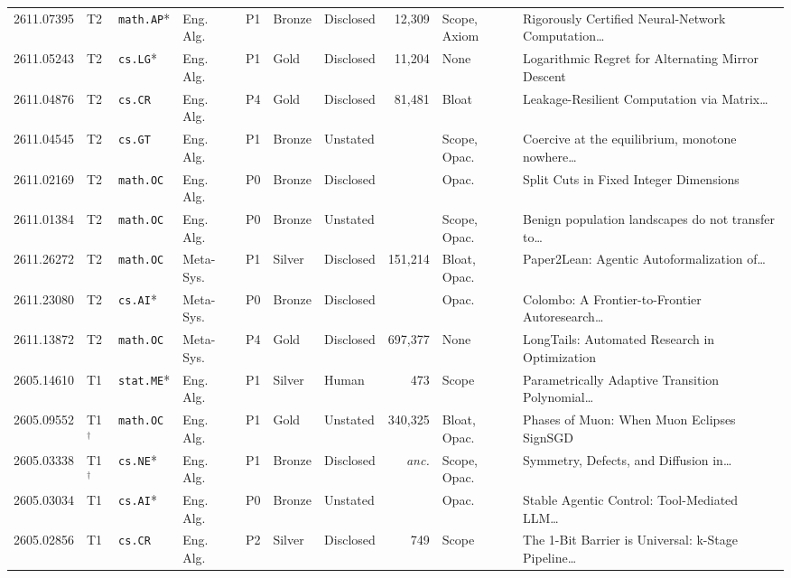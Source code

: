 \documentclass[11pt,letterpaper]{article}
\begin{document}
\begin{table}[p]
\begin{tabularx}{\textwidth}{lllllllrlX}
2611.07395 & T2 & \texttt{math.AP}* & Eng. Alg. & P1 & Bronze & Disclosed & 12,309 & Scope, Axiom & Rigorously Certified Neural-Network Computation\dots~\cite{arxiv2611_07395} \\
2611.05243 & T2 & \texttt{cs.LG}* & Eng. Alg. & P1 & Gold & Disclosed & 11,204 & None & Logarithmic Regret for Alternating Mirror Descent~\cite{arxiv2611_05243} \\
2611.04876 & T2 & \texttt{cs.CR} & Eng. Alg. & P4 & Gold & Disclosed & 81,481 & Bloat & Leakage-Resilient Computation via Matrix\dots~\cite{arxiv2611_04876} \\
2611.04545 & T2 & \texttt{cs.GT} & Eng. Alg. & P1 & Bronze & Unstated & \textemdash{} & Scope, Opac. & Coercive at the equilibrium, monotone nowhere\dots~\cite{arxiv2611_04545} \\
2611.02169 & T2 & \texttt{math.OC} & Eng. Alg. & P0 & Bronze & Disclosed & \textemdash{} & Opac. & Split Cuts in Fixed Integer Dimensions~\cite{arxiv2611_02169} \\
2611.01384 & T2 & \texttt{math.OC} & Eng. Alg. & P0 & Bronze & Unstated & \textemdash{} & Scope, Opac. & Benign population landscapes do not transfer to\dots~\cite{arxiv2611_01384} \\
\midrule
2611.26272 & T2 & \texttt{math.OC} & Meta-Sys. & P1 & Silver & Disclosed & 151,214 & Bloat, Opac. & Paper2Lean: Agentic Autoformalization of\dots~\cite{arxiv2611_26272} \\
2611.23080 & T2 & \texttt{cs.AI}* & Meta-Sys. & P0 & Bronze & Disclosed & \textemdash{} & Opac. & Colombo: A Frontier-to-Frontier Autoresearch\dots~\cite{arxiv2611_23080} \\
2611.13872 & T2 & \texttt{math.OC} & Meta-Sys. & P4 & Gold & Disclosed & 697,377 & None & LongTails: Automated Research in Optimization~\cite{arxiv2611_13872} \\
\midrule
2605.14610 & T1 & \texttt{stat.ME}* & Eng. Alg. & P1 & Silver & Human & 473 & Scope & Parametrically Adaptive Transition Polynomial\dots~\cite{arxiv2605_14610} \\
2605.09552 & T1$^\dagger$ & \texttt{math.OC} & Eng. Alg. & P1 & Gold & Unstated & 340,325 & Bloat, Opac. & Phases of Muon: When Muon Eclipses SignSGD~\cite{arxiv2605_09552} \\
2605.03338 & T1$^\dagger$ & \texttt{cs.NE}* & Eng. Alg. & P1 & Bronze & Disclosed & \emph{anc.} & Scope, Opac. & Symmetry, Defects, and Diffusion in\dots~\cite{arxiv2605_03338} \\
2605.03034 & T1 & \texttt{cs.AI}* & Eng. Alg. & P0 & Bronze & Unstated & \textemdash{} & Opac. & Stable Agentic Control: Tool-Mediated LLM\dots~\cite{arxiv2605_03034} \\
2605.02856 & T1 & \texttt{cs.CR} & Eng. Alg. & P2 & Silver & Disclosed & 749 & Scope & The 1-Bit Barrier is Universal: k-Stage Pipeline\dots~\cite{arxiv2605_02856} \\
\bottomrule
\end{tabularx}
\end{table}
\end{document}
